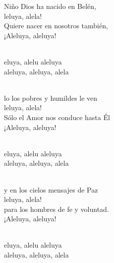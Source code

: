 \documentclass[12pt]{article}
\begin{document}
\begin{multicols*}{2}
\begin{cancion}%
	 Niño Dios ha nacido en Belén,\\
	leluya, alela!\\
Quiere nacer en nosotros también,\\
¡Aleluya, aleluya!\\\jump\\
	\begin{chorus}%
	eluya, alelu aleluya\\
	aleluya, aleluya, alela\\
	\end{chorus}%
	\jump\\
	lo los pobres y humildes le ven \\
	leluya, alela!\\
Sólo el Amor nos conduce hasta Él\\
¡Aleluya, aleluya!\\\jump\\
	\begin{chorus}%
	eluya, alelu aleluya\\
	aleluya, aleluya, alela\\
	\end{chorus}%
	\jump\\
	y en los cielos mensajes de Paz\\
	leluya, alela!\\
para los hombres de fe y voluntad.\\
¡Aleluya, aleluya!\\\jump\\
	\begin{chorus}%
	eluya, alelu aleluya\\
	aleluya, aleluya, alela\\
	\end{chorus}%
	\jump\\
\end{cancion}%


\end{multicols*}
\end{document}
